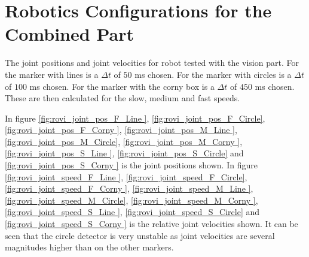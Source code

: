 \section{Robotics Configurations for the Combined Part}
\label{app:joint_positions_combined_part}

The joint positions and joint velocities for robot tested with the vision part.
For the marker with lines is a $\Delta t$ of $50$ ms chosen.
For the marker with circles is a $\Delta t$ of $100$ ms chosen.
For the marker with the corny box is a $\Delta t$ of $450$ ms chosen.
These are then calculated for the slow, medium and fast speeds.

In figure 
\ref{fig:rovi_joint_pos_F_Line  },
\ref{fig:rovi_joint_pos_F_Circle},
\ref{fig:rovi_joint_pos_F_Corny },
\ref{fig:rovi_joint_pos_M_Line  },
\ref{fig:rovi_joint_pos_M_Circle},
\ref{fig:rovi_joint_pos_M_Corny },
\ref{fig:rovi_joint_pos_S_Line  },
\ref{fig:rovi_joint_pos_S_Circle} and
\ref{fig:rovi_joint_pos_S_Corny } is the joint positions shown.
In figure 
\ref{fig:rovi_joint_speed_F_Line  }, 
\ref{fig:rovi_joint_speed_F_Circle},
\ref{fig:rovi_joint_speed_F_Corny },
\ref{fig:rovi_joint_speed_M_Line  },
\ref{fig:rovi_joint_speed_M_Circle},
\ref{fig:rovi_joint_speed_M_Corny },
\ref{fig:rovi_joint_speed_S_Line  },
\ref{fig:rovi_joint_speed_S_Circle} and
\ref{fig:rovi_joint_speed_S_Corny } is the relative joint velocities shown.
It can be seen that the circle detector is very unstable as joint velocities are several magnitudes higher than on the other markers.

